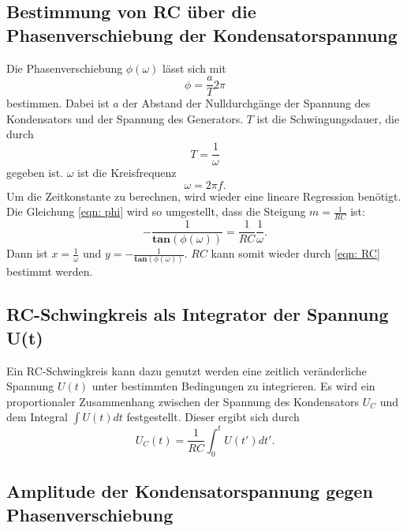 \subsection{Bestimmung von RC über die Phasenverschiebung der Kondensatorspannung}
Die Phasenverschiebung $\phi(\omega)$ lässt sich mit
\begin{equation}
    \phi = \frac{a}{T}2\pi
\end{equation}
bestimmen. Dabei ist $a$ der Abstand der Nulldurchgänge der Spannung des Kondensators und der Spannung des Generators.
$T$ ist die Schwingungsdauer, die durch
\begin{equation}
    T = \frac{1}{\omega}
\end{equation}
gegeben ist. $\omega$ ist die Kreisfrequenz
\begin{equation*}
    \omega = 2\pi f.
\end{equation*}
Um die Zeitkonstante zu berechnen, wird wieder eine lineare Regression benötigt.
Die Gleichung \eqref{eqn: phi} wird so umgestellt, dass die Steigung $m = \frac{1}{RC}$ ist:
\begin{equation}
    -\frac{1}{\mathbf{tan}(\phi(\omega))} = \frac{1}{RC} \frac{1}{\omega}.
    \label{eqn: linreg3} 
\end{equation}
Dann ist $x= \frac{1}{\omega}$ und $y= -\frac{1}{\mathbf{tan}(\phi(\omega))}$.
$RC$ kann somit wieder durch \eqref{eqn: RC} bestimmt werden.

\subsection{RC-Schwingkreis als Integrator der Spannung U(t)}
Ein RC-Schwingkreis kann dazu genutzt werden eine zeitlich veränderliche Spannung $U(t)$ unter bestimmten Bedingungen zu integrieren. 
Es wird ein proportionaler Zusammenhang zwischen der Spannung des Kondensators $U_{C}$ und dem Integral $\int U(t) dt$ festgestellt. Dieser ergibt sich durch 
\begin{equation}
    U_{C}(t) = \frac{1}{RC} \int_{0}^{t} U(t') dt'.
\end{equation}

\subsection{Amplitude der Kondensatorspannung gegen Phasenverschiebung}
